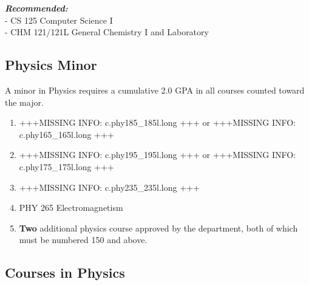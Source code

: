 \documentclass[
  letterpaper,
]{scrbook}
\begin{document}
\textbf{\emph{Recommended:}}\\
- CS 125 Computer Science I\\
- CHM 121/121L General Chemistry I and Laboratory

\subsection{Physics Minor}\label{physics-minor}

A minor in Physics requires a cumulative 2.0 GPA in all courses counted
toward the major.

\begin{enumerate}
\def\labelenumi{\arabic{enumi}.}
\item
  +++MISSING INFO: c.phy185\_185l.long +++ or +++MISSING INFO:
  c.phy165\_165l.long +++
\item
  +++MISSING INFO: c.phy195\_195l.long +++ or +++MISSING INFO:
  c.phy175\_175l.long +++
\item
  +++MISSING INFO: c.phy235\_235l.long +++
\item
  PHY 265 Electromagnetism
\item
  \textbf{Two} additional physics course approved by the department,
  both of which must be numbered 150 and above.
\end{enumerate}

\subsection{Courses in Physics}\label{courses-in-physics}
\end{document}
